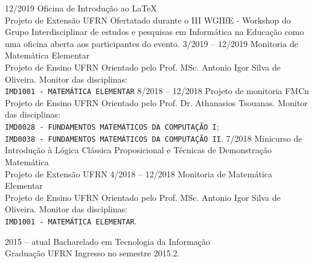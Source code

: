 \documentclass[9pt]{developercv} %
\begin{document}


\begin{entrylist}
    \entry
        {12/2019}
        {Oficina de Introdução ao \LaTeX{}\\
            \footnotesize{{Projeto de Extensão}}}
        {UFRN}
        {Ofertatado durante o III WGIIfE - Workshop do Grupo Interdisciplinar de estudos e pesquisas em Informática na Educação como uma oficina aberta aos participantes do evento.}
    \entry
        {3/2019 -- 12/2019}
        {Monitoria de Matemática Elementar\\
            \footnotesize{Projeto de Ensino}}
        {UFRN}
        {Orientado pelo Prof. MSc. Antonio Igor Silva de Oliveira. Monitor das disciplinas:\\
        \texttt{IMD1001 - MATEMÁTICA ELEMENTAR}}
    \entry
        {8/2018 -- 12/2018}
        {Projeto de monitoria FMCn\\
            \footnotesize{Projeto de Ensino}}
        {UFRN}
        {Orientado pelo Prof. Dr. Athanasios Tsouanas. Monitor das disciplinas:\\
            \texttt{IMD0028 - FUNDAMENTOS MATEMÁTICOS DA COMPUTAÇÃO I};\\
            \texttt{IMD0038 - FUNDAMENTOS MATEMÁTICOS DA COMPUTAÇÃO II}.}
    \entry
        {7/2018}
        {Minicurso de Introdução à Lógica Clássica Proposicional e Técnicas de Demonstração Matemática\\
            \footnotesize{{Projeto de Extensão}}}
        {UFRN}
        {}
    \entry
        {4/2018 -- 12/2018}
        {Monitoria de Matemática Elementar\\
            \footnotesize{Projeto de Ensino}}
        {UFRN}
        {Orientado pelo Prof. MSc. Antonio Igor Silva de Oliveira. Monitor das disciplinas:\\
            \texttt{IMD1001 - MATEMÁTICA ELEMENTAR}.}
\end{entrylist}



\begin{entrylist}
    \entry
        {2015 -- atual}
        {Bacharelado em Tecnologia da Informação\\
            \footnotesize{Graduação}}
        {UFRN}
        {Ingresso no semestre 2015.2.}
\end{entrylist}
\end{document}
